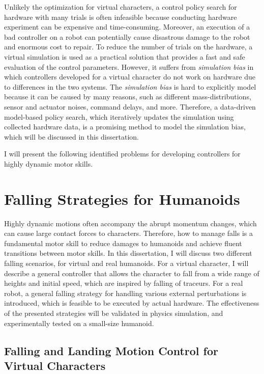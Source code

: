 Unlikely the optimization for virtual characters,
a control policy search for hardware with many trials is often infeasible
because conducting hardware experiment can be expensive and time-consuming.
Moreover, an execution of a bad controller on a robot can potentially cause
disastrous damage to the robot and enormous cost to repair.
To reduce the number of trials on the hardware, a virtual simulation 
is used as a practical solution that provides a fast and safe evaluation
of the control parameters.
However, it suffers from \emph{simulation bias} in which
controllers developed for a virtual character do not work on hardware due
to differences in the two systems.
The \emph{simulation bias} is hard to explicitly model because it can
be caused by many reasons, such as different mass-distributions, sensor 
and actuator noises, command delays, and more.
Therefore, a data-driven model-based policy search, which iteratively 
updates the simulation using collected hardware data, is a promising method 
to model the simulation bias, which will be discussed in this dissertation.

I will present the following identified problems for developing 
controllers for highly dynamic motor skills.

\section{Falling Strategies for Humanoids}
Highly dynamic motions often accompany the abrupt momentum changes, which can
cause large contact forces to characters.
Therefore, how to manage falls is a fundamental motor skill to reduce damages
to humanoids and achieve fluent transitions between motor skills.
In this dissertation, I will discuss two different falling scenarios, 
for  virtual and real humanoids.
For a virtual character, I will describe a general controller that allows the character to fall from a wide range of heights and initial speed,
which are inspired by falling of traceurs.
For a real robot, a general falling strategy for handling various 
external perturbations is introduced, which is feasible to be
executed by actual hardware.
The effectiveness of the presented strategies will be validated in physics
simulation, and experimentally tested on a small-size humanoid.

\subsection{Falling and Landing Motion Control for Virtual Characters}

